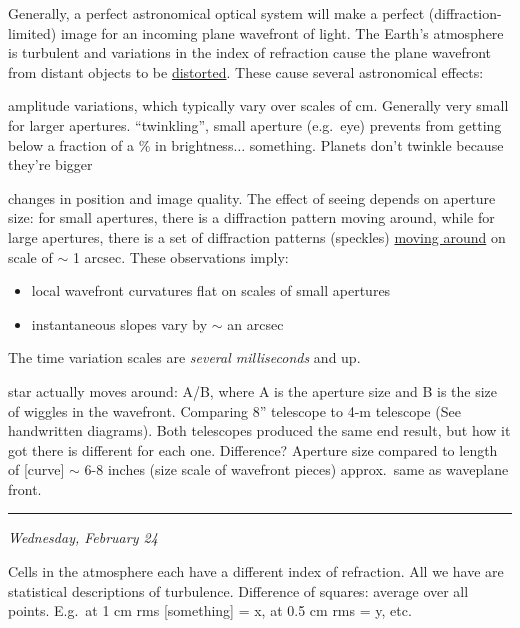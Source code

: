 \documentclass[12pt]{article}
\newcommand{\mynotes}[1]{\textcolor{myBlue}{#1}}
\newcommand{\mydate}[1]{
    \begin{flushright}
        \rule{\textwidth}{0.4pt} %
        \footnotesize\hfill\textit{#1}
    \end{flushright}}
\begin{document}
Generally, a perfect astronomical optical system will make a perfect
(diffraction-limited) image for an incoming plane wavefront of light. The
Earth's atmosphere is turbulent and variations in the index of refraction
cause the plane wavefront from distant objects to be \href{http://astronomy.nmsu.edu/holtz/a535/html/diagrams/a535/seeing.htm}
{distorted}. These cause several astronomical effects:
\begin{description}[style=nextline]
    \item [scintillation] amplitude variations, which typically vary over
        scales of cm. Generally very small for larger apertures.
        \mynotes{``twinkling'', small aperture (e.g.\ eye) prevents from
        getting below a fraction of a \% in brightness$\ldots$ something.
        Planets don't twinkle because they're bigger}
    \item [seeing] changes in position and image quality. The effect of seeing
        depends on aperture size: for small apertures, there is a diffraction
        pattern moving around, while for large apertures, there is a set of
        diffraction patterns (speckles) \href{https://en.wikipedia.org/wiki/Speckle_imaging#/media/File:Eps_aql_movie_not_2000.gif}
        {moving around} on scale of $\sim$ 1 arcsec. These observations imply:
        \begin{itemize}
            \item local wavefront curvatures flat on scales of small apertures
            \item instantaneous slopes vary by $\sim$ an arcsec
        \end{itemize}
\end{description}
The time variation scales are \emph{several milliseconds} and up.

\mynotes{star actually moves around: A/B, where A is the aperture size and B is
the size of wiggles in the wavefront. Comparing 8'' telescope to 4-m telescope
(See handwritten diagrams). Both telescopes produced the same end result, but
how it got there is different for each one. Difference? Aperture size compared
to length of [curve] $\sim$ 6-8 inches (size scale of wavefront pieces)
approx.\ same as waveplane front.}

\mydate{Wednesday, February 24}

\mynotes{Cells in the atmosphere each have a different index of refraction. All
we have are statistical descriptions of turbulence. Difference of squares:
average over all points. E.g.\ at 1 cm rms [something] = x, at 0.5 cm rms = y,
etc.}
\end{document}

